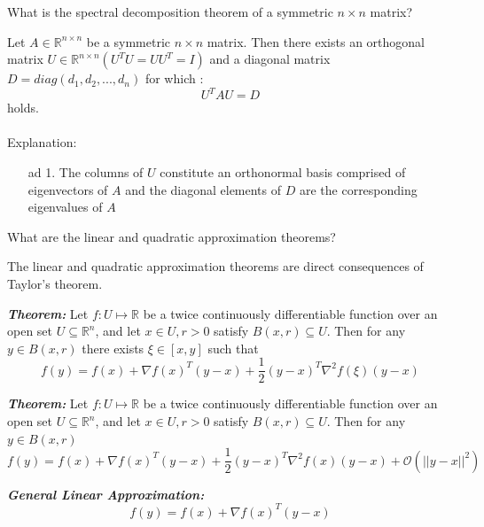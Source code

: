 \documentclass[12pt,a4paper]{article}
\begin{document}
\begin{question}
What is the spectral decomposition theorem of a symmetric $n \times n$ matrix?
\end{question}

Let $A\in\mathbb{R}^{n \times n}$ be a symmetric $n \times n$ matrix. Then there exists an orthogonal matrix $U\in \mathbb{R}^{n \times n}(U^T U = UU^T = I)$ and a diagonal matrix $D = diag(d_1,d_2,...,d_n)$ for which  :
\begin{equation*}
    U^T AU = D
\end{equation*}
holds. \\\\
Explanation:
\begin{enumerate}
    \item[ad 1.]
The columns of $U$ constitute an orthonormal basis comprised of eigenvectors of $A$ and the diagonal elements of $D$ are the corresponding eigenvalues of $A$
\end{enumerate}


\begin{question}
What are the linear and quadratic approximation theorems?
\end{question}
The linear and quadratic approximation theorems are direct consequences of Taylor's theorem.

\textit{\textbf{Theorem:}}
Let $f: U \mapsto \mathbb{R}$ be a twice continuously differentiable function over an open set $U \subseteq \mathbb{R}^n$, and let $x \in U, r > 0$ satisfy $B(x, r) \subseteq U$. Then for any $y \in B(x, r)$ there exists $\xi \in [x, y]$ such that
\begin{equation*}
    f(y) = f(x) + \nabla f(x)^T(y-x) + \frac{1}{2}(y-x)^T \nabla ^2 f(\xi)(y-x)
\end{equation*}

\textit{\textbf{Theorem:}}
Let $f: U \mapsto \mathbb{R}$ be a twice continuously differentiable function over an open set $U \subseteq \mathbb{R}^n$, and let $x \in U, r > 0$ satisfy $B(x,r) \subseteq U$. Then for any $y \in B(x, r)$
\begin{equation*}
    f(y) = f(x) + \nabla f(x)^T(y-x) + \frac{1}{2}(y-x)^T \nabla ^2 f(x)(y-x) + \mathcal{O}(||y-x||^2)
\end{equation*}

\textbf{\textit{General Linear Approximation:}}
\begin{equation*}
    f(y) = f(x) + \nabla f(x)^T (y-x)
\end{equation*}
\end{document}
